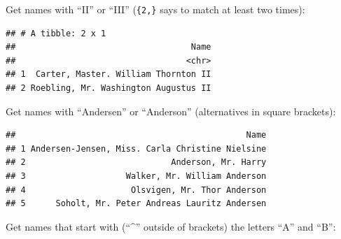 \documentclass[]{book}
\makeatletter
\newenvironment{Shaded}{\begin{snugshade}}{\end{snugshade}}
\newcommand{\KeywordTok}[1]{\textcolor[rgb]{0.13,0.29,0.53}{\textbf{#1}}}
\newcommand{\DecValTok}[1]{\textcolor[rgb]{0.00,0.00,0.81}{#1}}
\newcommand{\StringTok}[1]{\textcolor[rgb]{0.31,0.60,0.02}{#1}}
\newcommand{\OperatorTok}[1]{\textcolor[rgb]{0.81,0.36,0.00}{\textbf{#1}}}
\newcommand{\NormalTok}[1]{#1}
\newenvironment{kframe}{%
\medskip{}
\setlength{\fboxsep}{.8em}
 \def\at@end@of@kframe{}%
 \ifinner\ifhmode%
  \def\at@end@of@kframe{\end{minipage}}%
  \begin{minipage}{\columnwidth}%
 \fi\fi%
 \def\FrameCommand##1{\hskip\@totalleftmargin \hskip-\fboxsep
 \colorbox{shadecolor}{##1}\hskip-\fboxsep
     \hskip-\linewidth \hskip-\@totalleftmargin \hskip\columnwidth}%
 \MakeFramed {\advance\hsize-\width
   \@totalleftmargin\z@ \linewidth\hsize
   \@setminipage}}%
 {\par\unskip\endMakeFramed%
 \at@end@of@kframe}
\renewenvironment{Shaded}{\begin{kframe}}{\end{kframe}}
\theoremstyle{definition}
\theoremstyle{definition}
\theoremstyle{definition}
\theoremstyle{remark}
\makeatother
\begin{document}
Get names with ``II'' or ``III'' (\texttt{\{2,\}} says to match at least
two times):

\begin{Shaded}
\end{Shaded}

\begin{verbatim}
## # A tibble: 2 x 1
##                                   Name
##                                  <chr>
## 1  Carter, Master. William Thornton II
## 2 Roebling, Mr. Washington Augustus II
\end{verbatim}

Get names with ``Andersen'' or ``Anderson'' (alternatives in square
brackets):

\begin{Shaded}
\end{Shaded}

\begin{verbatim}
##                                              Name
## 1 Andersen-Jensen, Miss. Carla Christine Nielsine
## 2                             Anderson, Mr. Harry
## 3                    Walker, Mr. William Anderson
## 4                     Olsvigen, Mr. Thor Anderson
## 5      Soholt, Mr. Peter Andreas Lauritz Andersen
\end{verbatim}

Get names that start with (``\^{}'' outside of brackets) the letters
``A'' and ``B'':

\begin{Shaded}
\end{Shaded}
\end{document}
